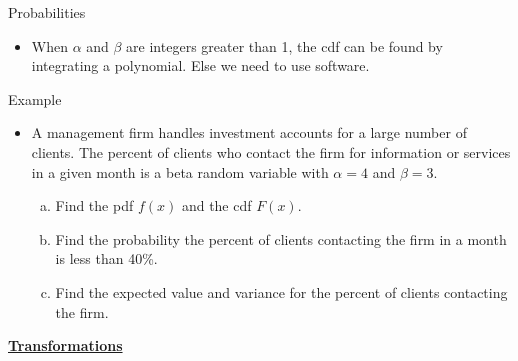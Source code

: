 \documentclass{article}
\newcommand{\bu}[1]{\textbf{\ul{#1}}}				%
\begin{document}
Probabilities\bigskip
\begin{itemize}
    \item When $\alpha$ and $\beta$ are integers greater than 1, the cdf can be found by integrating a polynomial. Else we need to use software.
\end{itemize}\bigskip

Example\bigskip
\begin{itemize}
    \item A management firm handles investment accounts for a large number of clients. The percent of clients who contact the firm for information or services in a given month is a beta random variable with $\alpha = 4$ and $\beta = 3$.
    \begin{enumerate}[(a)]
        \item Find the pdf $f(x)$ and the cdf $F(x)$.\vspace{100pt}
        \item Find the probability the percent of clients contacting the firm in a month is less than 40\%.\vspace{20pt}
        \item Find the expected value and variance for the percent of clients contacting the firm.\vspace{20pt}
    \end{enumerate}
\end{itemize}\bigskip

\bu{Transformations}\bigskip
\end{document}
